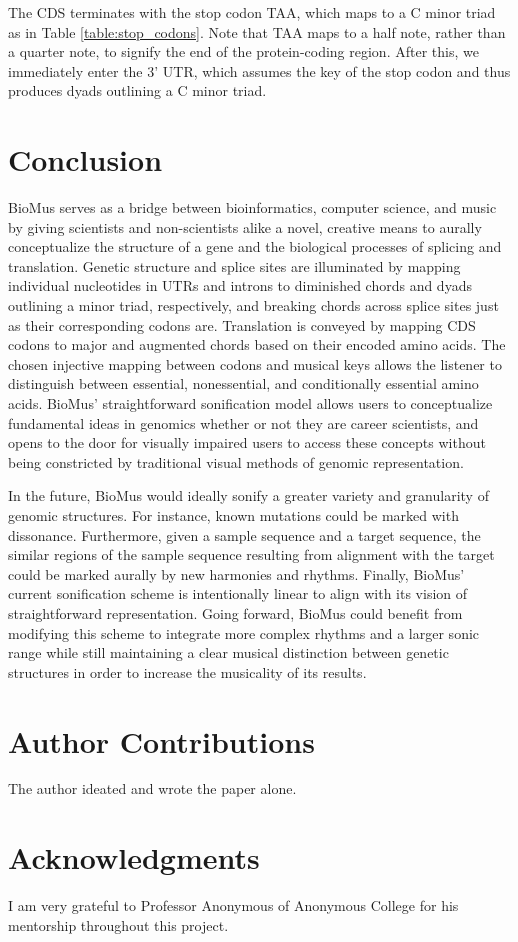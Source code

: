 \documentclass[letterpaper]{article}
\begin{document}
The CDS terminates with the stop codon TAA, which maps to a C minor triad as in Table \ref{table:stop_codons}. Note that TAA maps to a half note, rather than a quarter note, to signify the end of the protein-coding region. After this, we immediately enter the 3’ UTR, which assumes the key of the stop codon and thus produces dyads outlining a C minor triad.

\section{Conclusion}
BioMus serves as a bridge between bioinformatics, computer science, and music by giving scientists and non-scientists alike a novel, creative means to aurally conceptualize the structure of a gene and the biological processes of splicing and translation. Genetic structure and splice sites are illuminated by mapping individual nucleotides in UTRs and introns to diminished chords and dyads outlining a minor triad, respectively, and breaking chords across splice sites just as their corresponding codons are. Translation is conveyed by mapping CDS codons to major and augmented chords based on their encoded amino acids. The chosen injective mapping between codons and musical keys allows the listener to distinguish between essential, nonessential, and conditionally essential amino acids. BioMus’ straightforward sonification model allows users to conceptualize fundamental ideas in genomics whether or not they are career scientists, and opens to the door for visually impaired users to access these concepts without being constricted by traditional visual methods of genomic representation.

In the future, BioMus would ideally sonify a greater variety and granularity of genomic structures. For instance, known mutations could be marked with dissonance. Furthermore, given a sample sequence and a target sequence, the similar regions of the sample sequence resulting from alignment with the target could be marked aurally by new harmonies and rhythms. Finally, BioMus’ current sonification scheme is intentionally linear to align with its vision of straightforward representation. Going forward, BioMus could benefit from modifying this scheme to integrate more complex rhythms and a larger sonic range while still maintaining a clear musical distinction between genetic structures in order to increase the musicality of its results.

\section{Author Contributions}

The author ideated and wrote the paper alone.

\section{Acknowledgments}

I am very grateful to Professor Anonymous of Anonymous College for his mentorship throughout this project.




\end{document}
